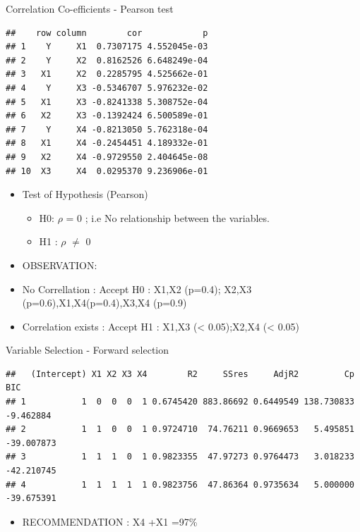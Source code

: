 \documentclass[
  ignorenonframetext,
]{beamer}
\providecommand{\tightlist}{%
  \setlength{\itemsep}{0pt}\setlength{\parskip}{0pt}}
\begin{document}
\begin{frame}[fragile]{Correlation Co-efficients - Pearson test}
\protect\hypertarget{correlation-co-efficients---pearson-test}{}
\tiny

\begin{verbatim}
##    row column        cor            p
## 1    Y     X1  0.7307175 4.552045e-03
## 2    Y     X2  0.8162526 6.648249e-04
## 3   X1     X2  0.2285795 4.525662e-01
## 4    Y     X3 -0.5346707 5.976232e-02
## 5   X1     X3 -0.8241338 5.308752e-04
## 6   X2     X3 -0.1392424 6.500589e-01
## 7    Y     X4 -0.8213050 5.762318e-04
## 8   X1     X4 -0.2454451 4.189332e-01
## 9   X2     X4 -0.9729550 2.404645e-08
## 10  X3     X4  0.0295370 9.236906e-01
\end{verbatim}

\normalsize

\begin{itemize}
\tightlist
\item
  Test of Hypothesis (Pearson)

  \begin{itemize}
  \tightlist
  \item
    H0: \(\rho\) = 0 ; i.e No relationship between the variables.
  \item
    H1 : \(\rho\) \(\neq\) 0
  \end{itemize}
\item
  OBSERVATION:
\item
  No Correllation : Accept H0 : X1,X2 (p=0.4); X2,X3
  (p=0.6),X1,X4(p=0.4),X3,X4 (p=0.9)
\item
  Correlation exists : Accept H1 : X1,X3 (\textless{} 0.05);X2,X4
  (\textless{} 0.05)
\end{itemize}
\end{frame}

\begin{frame}[fragile]{Variable Selection - Forward selection}
\protect\hypertarget{variable-selection---forward-selection}{}
\begin{verbatim}
##   (Intercept) X1 X2 X3 X4        R2     SSres     AdjR2         Cp        BIC
## 1           1  0  0  0  1 0.6745420 883.86692 0.6449549 138.730833  -9.462884
## 2           1  1  0  0  1 0.9724710  74.76211 0.9669653   5.495851 -39.007873
## 3           1  1  1  0  1 0.9823355  47.97273 0.9764473   3.018233 -42.210745
## 4           1  1  1  1  1 0.9823756  47.86364 0.9735634   5.000000 -39.675391
\end{verbatim}

\begin{itemize}
\tightlist
\item
  RECOMMENDATION : X4 +X1 =97\%
\end{itemize}
\end{frame}
\end{document}
